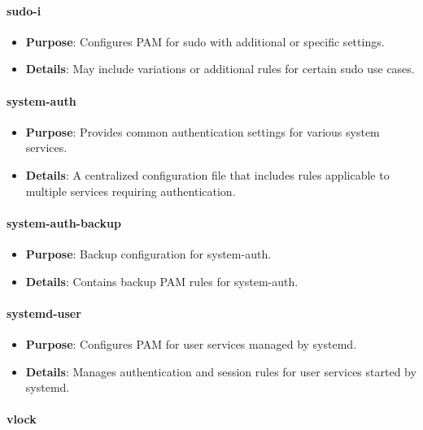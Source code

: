 \documentclass{article}
\begin{document}
\paragraph{sudo-i}

\begin{itemize}
    \item \textbf{Purpose}: Configures PAM for sudo with additional or specific settings.
    \item \textbf{Details}: May include variations or additional rules for certain sudo use cases.
\end{itemize}

\paragraph{system-auth}

\begin{itemize}
    \item \textbf{Purpose}: Provides common authentication settings for various system services.
    \item \textbf{Details}: A centralized configuration file that includes rules applicable to multiple services requiring authentication.
\end{itemize}

\paragraph{system-auth-backup}

\begin{itemize}
    \item \textbf{Purpose}: Backup configuration for system-auth.
    \item \textbf{Details}: Contains backup PAM rules for system-auth.
\end{itemize}

\paragraph{systemd-user}

\begin{itemize}
    \item \textbf{Purpose}: Configures PAM for user services managed by systemd.
    \item \textbf{Details}: Manages authentication and session rules for user services started by systemd.
\end{itemize}

\paragraph{vlock}
\end{document}

